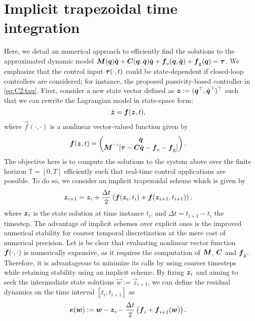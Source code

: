 \section{Implicit trapezoidal time integration}
\label{app:C2:timeint}
\noindent Here, we detail an numerical approach to efficiently find the solutions to the approximated dynamic model ${\boldsymbol{M}}({\boldsymbol{q}}){\ddot{\boldsymbol{q}}} + {\boldsymbol{C}}({\boldsymbol{q}},{\dot{\boldsymbol{q}}}){\dot{\boldsymbol{q}}} + {\boldsymbol{f}}_{\scriptstyle\textrm{e}}({\boldsymbol{q}},{\dot{\boldsymbol{q}}}) +  {\boldsymbol{f}}_{\scriptstyle\textrm{g}}({\boldsymbol{q}}) = \boldsymbol{\tau}$. We emphasize that the control input $\boldsymbol{\tau}(\cdot,t)$ could be state-dependent if closed-loop controllers are considered; for instance, the proposed passivity-based controller in \eqref{eq:C2:tau}. First, consider a new state vector defined as $\boldsymbol{z} := ( {\boldsymbol{q}}^\top,{\dot{\boldsymbol{q}}}^\top )^\top$ such that we can rewrite the Lagrangian model in state-space form:
%
\begin{equation}
\dot{{\boldsymbol{z}}} = \boldsymbol{f}({\boldsymbol{z}},t),
\end{equation}
%
where $\vec{f}(\cdot,\cdot)$ is a nonlinear vector-valued function given by
%
\begin{equation}
\vec{f}(\zB,t) = \begin{pmatrix} \dq \\ \mat{M}\inv [\tauB - \CB\dq - \fB\elastic- \fB\grav] \end{pmatrix}.
\end{equation}
%
The objective here is to compute the solutions to the system above over the finite horizon $\mathbb{T} = [0,T]$ efficiently such that real-time control applications are possible. To do so, we consider an implicit trapezoidal scheme which is given by
%
\begin{equation}
{\boldsymbol{z}}_{i+1} = {\boldsymbol{z}}_{i} + \frac{\Delta t}{2} \left( {\boldsymbol{f}}({\boldsymbol{z}}_{i},t_{i}) + {\boldsymbol{f}}({\boldsymbol{z}}_{i+1},t_{i+1})  \right),
\end{equation}
%
where ${\boldsymbol{z}}_{i}$ is the state solution at time instance $t_{i}$, and $\Delta t = t_{i+1} - t_{i}$ the timestep. The advantage of implicit schemes over explicit ones is the improved numerical stability for coarser temporal discretization at the mere cost of numerical precision. Let is be clear that evaluating nonlinear vector function ${\boldsymbol{f}}(\cdot,\cdot)$ is numerically expensive, as it requires the computation of $\boldsymbol{M}$, $\boldsymbol{C}$ and $\boldsymbol{{\boldsymbol{f}}}_{\scriptstyle\textrm{g}}$. Therefore, it is advantageous to minimize its calls by using coarser timesteps while retaining stability using an implicit scheme. By fixing ${\boldsymbol{z}}_{i}$ and aiming to seek the intermediate state solutions $\vec{w}:=\vec{z}_{i+1}$, we can define the residual dynamics on the time interval $[t_{i}, t_{i+1}]$ as
%
\begin{align}
{\boldsymbol{e}}({\boldsymbol{w}}) :=  {\boldsymbol{w}} - {\boldsymbol{z}}_{i} - \frac{\Delta t}{2} \left( {\boldsymbol{f}}_i + {\boldsymbol{f}}_{i+1}({\boldsymbol{w}})  \right).
\end{align}
